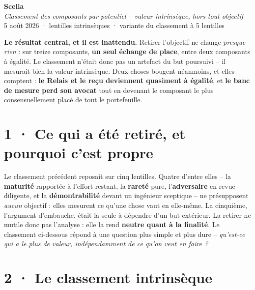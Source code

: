 \documentclass[10pt]{article}
\begin{document}
\begin{center}
{\Huge\bfseries\color{navy} Scella}\\[4pt]
{\large\color{grey}\itshape Classement des composants par potentiel -- valeur intrinsèque, hors tout objectif}\\[4pt]
{\small\color{grey} 5 août 2026 \; ·  lentilles intrinsèques \; · \; variante du classement à 5 lentilles}
\end{center}
\vspace{2pt}

\begin{these}
\textbf{Le résultat central, et il est inattendu.} Retirer l'objectif ne change \emph{presque rien} :
sur treize composants, \textbf{un seul échange de place}, entre deux composants à égalité. Le classement
n'était donc pas un artefact du but poursuivi -- il mesurait bien la valeur intrinsèque. Deux choses
bougent néanmoins, et elles comptent : \textbf{le Relais et le reçu deviennent quasiment à égalité}, et
\textbf{le banc de mesure perd son avocat} tout en devenant le composant le plus consensuellement placé
de tout le portefeuille.
\end{these}

\section{1 · Ce qui a été retiré, et pourquoi c'est propre}

Le classement précédent reposait sur cinq lentilles. Quatre d'entre elles -- la \textbf{maturité}
rapportée à l'effort restant, la \textbf{rareté} pure, l'\textbf{adversaire} en revue diligente, et la
\textbf{démontrabilité} devant un ingénieur sceptique -- ne présupposent \emph{aucun} objectif : elles
mesurent ce qu'une chose vaut en elle-même. La cinquième, l'argument d'embauche, était la seule à
dépendre d'un but extérieur. La retirer ne mutile donc pas l'analyse : elle la rend \textbf{neutre quant
à la finalité}. Le classement ci-dessous répond à une question plus simple et plus dure -- \emph{qu'est-ce
qui a le plus de valeur, indépendamment de ce qu'on veut en faire ?}

\section{2 · Le classement intrinsèque}
\end{document}
